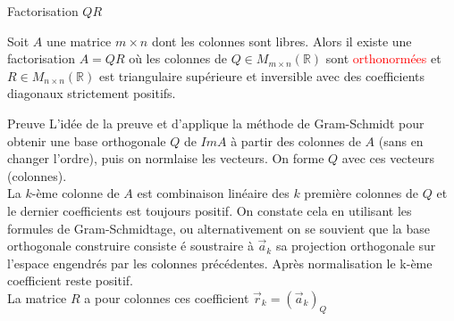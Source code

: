\begin{parag}{Factorisation $QR$}
    \begin{definition}
        Soit $A$ une matrice $m \times n$ dont les colonnes sont libres. Alors il existe une factorisation $A = QR$ où les colonnes de $Q \in M_{m\times n}(\mathbb{R})$ sont \textcolor{red}{orthonormées} et $R\in M_{n\times n}(\mathbb{R})$ est triangulaire supérieure et inversible avec des coefficients diagonaux strictement positifs.
    \end{definition}
    \begin{subparag}{Preuve}
        L'idée de la preuve et d'applique la méthode de Gram-Schmidt pour obtenir une base orthogonale $Q$ de $ImA$ à partir des colonnes de $A$ (sans en changer l'ordre), puis on normlaise les vecteurs. On forme $Q$ avec ces vecteurs (colonnes).
        \\
        La $k$-ème colonne de $A$ est combinaison linéaire des $k$ première colonnes de $Q$ et le dernier coefficients est toujours positif. On constate cela en utilisant les formules de Gram-Schmidtage, ou alternativement on se souvient que la base orthogonale construire consiste é soustraire à $\vec{a}_k$ sa projection orthogonale sur l'espace engendrés par les colonnes précédentes. Après normalisation le k-ème coefficient reste positif.
        \\
        La matrice $R$  a pour colonnes ces coefficient $\vec{r}_k = (\vec{a}_k)_Q$
    \end{subparag}


\end{parag}
